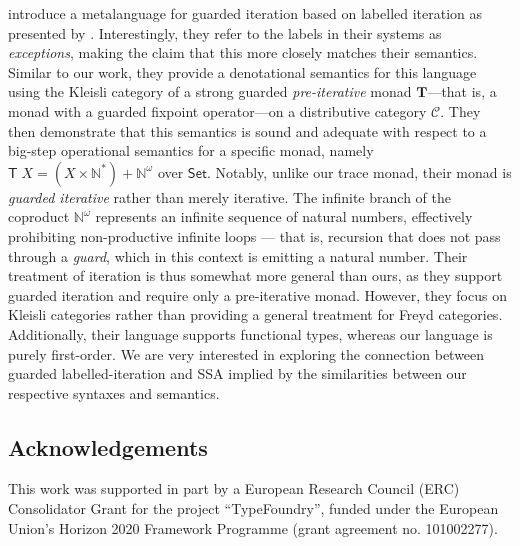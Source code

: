 \documentclass[acmsmall,screen,review]{acmart}
\newcommand{\mc}[1]{\ensuremath{\mathcal{#1}}}
\newcommand{\mb}[1]{\ensuremath{\mathbf{#1}}}
\newcommand{\ms}[1]{\ensuremath{\mathsf{#1}}}
\newcommand{\isotopessa}{\(\lambda_{\ms{SSA}}\)}
\begin{document}

\citet{goncharov-metalang-21} introduce a metalanguage for guarded iteration based on labelled
iteration as presented by \citet{geron-iteration-16}. Interestingly, they refer to the labels in
their systems as \emph{exceptions}, making the claim that this more closely matches their semantics.
Similar to our work, they provide a denotational semantics for this language using the Kleisli
category of a strong guarded \emph{pre-iterative} monad $\mb{T}$—that is, a monad with a guarded
fixpoint operator—on a distributive category $\mc{C}$. They then demonstrate that this semantics is
sound and adequate with respect to a big-step operational semantics for a specific monad, namely
$\ms{T}\;X = (X \times \mathbb{N}^\ast) + \mathbb{N}^\omega$ over $\ms{Set}$. Notably, unlike our trace
monad, their monad is \emph{guarded iterative} rather than merely iterative. The infinite branch of
the coproduct $\mathbb{N}^\omega$ represents an infinite sequence of natural numbers, effectively
prohibiting non-productive infinite loops — that is, recursion that does not pass through a
\emph{guard}, which in this context is emitting a natural number. Their treatment of iteration is
thus somewhat more general than ours, as they support guarded iteration and require only a
pre-iterative monad. However, they focus on Kleisli categories rather than providing a general
treatment for Freyd categories. Additionally, their language supports functional types, whereas our
language is purely first-order. We are very interested in exploring the connection between guarded
labelled-iteration and SSA implied by the similarities between our respective syntaxes and
semantics.

\subsection*{Acknowledgements}

This work was supported in part by a European Research Council (ERC) Consolidator Grant for the
project ``TypeFoundry'', funded under the European Union's Horizon 2020 Framework Programme (grant
agreement no. 101002277).
\end{document}
